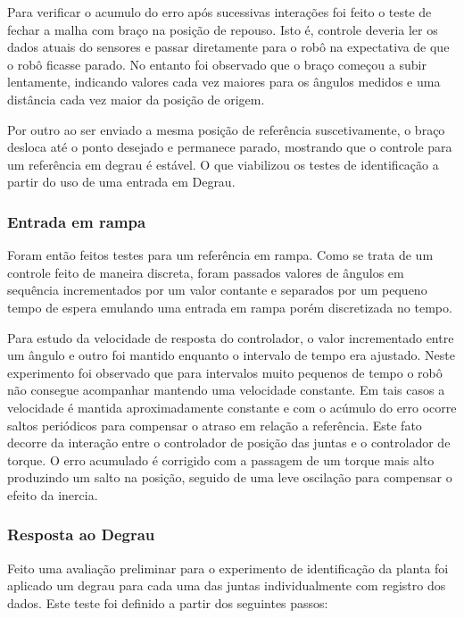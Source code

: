 Para verificar o acumulo do erro após sucessivas interações foi feito o teste de fechar a malha com braço na posição de repouso. Isto é, controle deveria ler os dados atuais do sensores e passar diretamente para o robô na expectativa de que o robô ficasse parado. No entanto foi observado que o braço começou a subir lentamente, indicando valores cada vez maiores para os ângulos medidos e uma distância cada vez maior da posição de origem.

Por outro ao ser enviado a mesma posição de referência suscetivamente, o braço desloca até o ponto desejado e permanece parado, mostrando que o controle para um referência em degrau é estável. O que viabilizou os testes de identificação a partir do uso de uma entrada em Degrau.

\subsubsection{Entrada em rampa}

Foram então feitos testes para um referência em rampa. Como se trata de um controle feito de maneira discreta, foram passados valores de ângulos em sequência incrementados por um valor contante e separados por um pequeno tempo de espera emulando uma entrada em rampa porém discretizada no tempo.

Para estudo da velocidade de resposta do controlador, o valor incrementado entre um ângulo e outro foi mantido enquanto o intervalo de tempo era ajustado. Neste experimento foi observado que para intervalos muito pequenos de tempo o robô não consegue acompanhar mantendo uma velocidade constante. Em tais casos a velocidade é mantida aproximadamente constante e com o acúmulo do erro ocorre saltos periódicos para compensar o atraso em relação a referência. Este fato decorre da interação entre o controlador de posição das juntas e o controlador de torque. O erro acumulado é corrigido com a passagem de um torque mais alto produzindo um salto na posição, seguido de uma leve oscilação para compensar o efeito da inercia.


\subsubsection{Resposta ao Degrau}

Feito uma avaliação preliminar para o experimento de identificação da planta foi aplicado um degrau para cada uma das juntas individualmente com registro dos dados. Este teste foi definido a partir dos seguintes passos:

